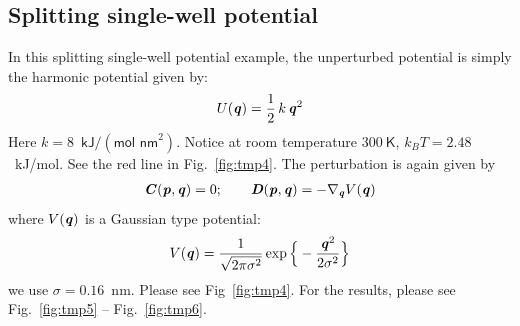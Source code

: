 \documentclass[aip,jcp,a4paper,reprint,onecolumn]{revtex4-1}
\newcommand{\vect}[1]{\textbf{\textit{#1}}}
\begin{document}




\subsection{Splitting single-well potential}

In this splitting single-well potential example, the unperturbed
potential is simply the harmonic potential given by:
\begin{align}
  U(\vect q) = \frac12\,k\,\vect q^2 
\end{align}
Here $k = 8$~$\textsf{kJ} / (\textsf{mol nm}^2)$.
Notice at room temperature $300\ \textsf{K}$, $k_BT = 2.48$~\textsf{kJ/mol}.
See the red line in Fig.~\ref{fig:tmp4}.
The perturbation is again given by
\begin{align}
  \vect C(\vect p, \vect q) = 0; \qquad
  \vect D(\vect p, \vect q) = -\nabla_{\vect q} V(\vect q) 
\end{align}
where $V(\vect q)$ is a Gaussian type potential:
\begin{align}
  V(\vect q) = \frac{1}{\sqrt{2\pi \sigma^2}}
  \exp\Big\{-\frac{\vect q^2}{2\sigma^2}\Big\}
\end{align}
we use $\sigma = 0.16$~\textsf{nm}. Please see Fig~\ref{fig:tmp4}.
For the results, please see Fig.~\ref{fig:tmp5} -- Fig.~\ref{fig:tmp6}.
\end{document}
